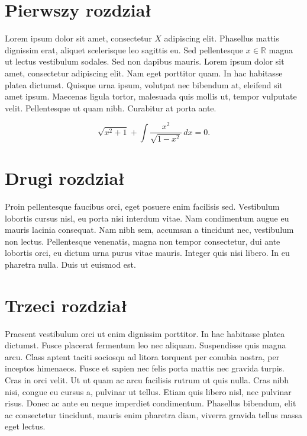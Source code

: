 \documentclass[a4paper]{article}
\begin{document}
\section{Pierwszy rozdział}

Lorem ipsum dolor sit amet, consectetur $X$ adipiscing elit. Phasellus mattis dignissim erat, aliquet scelerisque leo sagittis eu. Sed pellentesque $x\in\mathbb{R}$ magna ut lectus vestibulum sodales. Sed non dapibus mauris. Lorem ipsum dolor sit amet, consectetur adipiscing elit. Nam eget porttitor quam. In hac habitasse platea dictumst. Quisque urna ipsum, volutpat nec bibendum at, eleifend sit amet ipsum. Maecenas ligula tortor, malesuada quis mollis ut, tempor vulputate velit. Pellentesque ut quam nibh. Curabitur at porta ante. 

\begin{equation}
\sqrt{x^2 + 1} + \int \frac{x^2}{\sqrt{1 - x^2}}\, dx = 0.
\end{equation}


\section{Drugi rozdział}

\selectfont 
Proin pellentesque faucibus orci, eget posuere enim facilisis sed. Vestibulum lobortis cursus nisl, eu porta nisi interdum vitae. Nam condimentum augue eu mauris lacinia consequat. Nam nibh sem, accumsan a tincidunt nec, vestibulum non lectus. Pellentesque venenatis, magna non tempor consectetur, dui ante lobortis orci, eu dictum urna purus vitae mauris. Integer quis nisi libero. In eu pharetra nulla. Duis ut euismod est.

\section{Trzeci rozdział}


\selectfont 
Praesent vestibulum orci ut enim dignissim porttitor. In hac habitasse platea dictumst. Fusce placerat fermentum leo nec aliquam. Suspendisse quis magna arcu. Class aptent taciti sociosqu ad litora torquent per conubia nostra, per inceptos himenaeos. Fusce et sapien nec felis porta mattis nec gravida turpis. Cras in orci velit. Ut ut quam ac arcu facilisis rutrum ut quis nulla. Cras nibh nisi, congue eu cursus a, pulvinar ut tellus. Etiam quis libero nisl, nec pulvinar risus. Donec ac ante eu neque imperdiet condimentum. Phasellus bibendum, elit ac consectetur tincidunt, mauris enim pharetra diam, viverra gravida tellus massa eget lectus.
\end{document}
